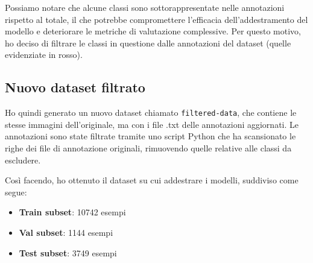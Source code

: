 Possiamo notare che alcune classi sono sottorappresentate nelle annotazioni rispetto al totale, il che potrebbe compromettere l'efficacia dell'addestramento del modello e deteriorare le metriche di valutazione complessive.
Per questo motivo, ho deciso di filtrare le classi in questione dalle annotazioni del dataset (quelle evidenziate in rosso).

\newpage

\subsection{Nuovo dataset filtrato}
Ho quindi generato un nuovo dataset chiamato \texttt{filtered-data}, che contiene le stesse immagini dell'originale, ma con i file .txt delle annotazioni aggiornati. Le annotazioni sono state filtrate tramite uno script Python che ha scansionato le righe dei file di annotazione originali, rimuovendo quelle relative alle classi da escludere.

Così facendo, ho ottenuto il dataset su cui addestrare i modelli, suddiviso come segue:
\begin{itemize}
    \item \textbf{Train subset}: 10742 esempi
    \item \textbf{Val subset}: 1144 esempi
    \item \textbf{Test subset}: 3749 esempi
\end{itemize}

\newpage

